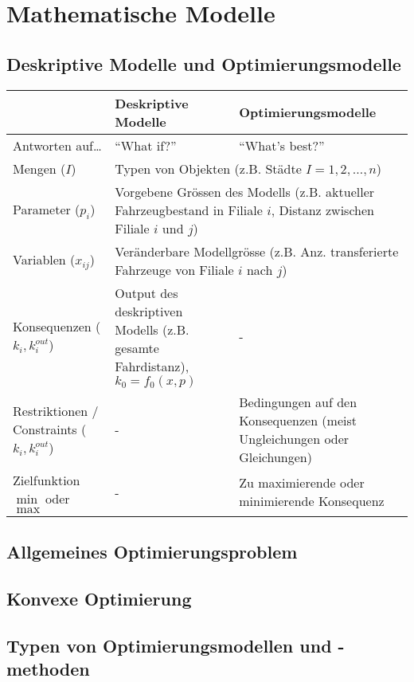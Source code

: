 \section{Mathematische Modelle }
\subsection{Deskriptive Modelle und Optimierungsmodelle }
  \begin{tabular}{|p{3.7cm}|p{7cm}|p{7cm}|}
    \hline
    & \textbf{Deskriptive Modelle}
    & \textbf{Optimierungsmodelle} \\
    \hline
    \hline
    Antworten auf\ldots
      & ``What if?''
      & ``What's best?'' \\
    \hline
    Mengen ($I$)
      & \multicolumn{2}{l|}{Typen von Objekten (z.B. Städte $I = {1,2,\ldots,n}$)} \\
    \hline
    Parameter ($p_i$)
      & \multicolumn{2}{p{14cm}|}{Vorgebene Grössen des Modells (z.B. aktueller Fahrzeugbestand in Filiale $i$, Distanz zwischen Filiale $i$ und $j$)} \\
    \hline
    Variablen ($x_{ij}$)
      & \multicolumn{2}{l|}{Veränderbare Modellgrösse (z.B. Anz. transferierte Fahrzeuge von Filiale $i$ nach $j$)} \\
    \hline
    Konsequenzen ($k_{i}, k_i^{out}$)
      & Output des deskriptiven Modells (z.B. gesamte Fahrdistanz), $k_0 = f_0(x,p)$ 
      & -\\
    \hline
    Restriktionen / Constraints ($k_{i}, k_i^{out}$)
      & - 
      & Bedingungen auf den Konsequenzen (meist Ungleichungen oder Gleichungen)\\
    \hline
    Zielfunktion $\min$ oder $\max$
      & - 
      & Zu maximierende oder minimierende Konsequenz\\
    \hline
  \end{tabular}


\subsection{Allgemeines Optimierungsproblem }
\subsection{Konvexe Optimierung }
\subsection{Typen von Optimierungsmodellen und -methoden }

